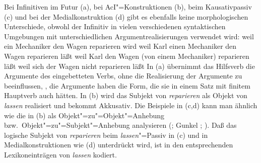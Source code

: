 Bei Infinitiven im Futur (a), bei AcI"=Konstruktionen (b), 
beim Kausativpassiv (c)
und bei der Medialkonstruktion (d) gibt es ebenfalls
keine morphologischen Unterschiede, obwohl der Infinitiv in vielen verschiedenen 
syntaktischen Umgebungen mit unterschiedlichen Argumentrealisierungen verwendet wird:
\eal
\label{bsp-kasus-reparieren}
\ex weil    ein Mechaniker     den Wagen     reparieren wird
\ex weil    Karl       einen Mechaniker     den Wagen     reparieren läßt
\ex weil    Karl       den Wagen     (von einem Mechaniker) reparieren läßt
\ex weil    sich der Wagen     nicht reparieren läßt
\zl
In (a) übernimmt das Hilfsverb die Argumente des eingebetteten Verbs, ohne die Realisierung
der Argumente zu beeinflussen, \dash, die Argumente haben die Form, die sie in einem Satz mit finitem
Hauptverb auch hätten. In (b) wird das Subjekt
von \emph{reparieren} als Objekt von \emph{lassen} realisiert und bekommt Akkusativ.
Die Beispiele in (c,d) kann man ähnlich wie die in (b)
als Objekt"=zu"=Objekt"=Anhebung
bzw.\ Objekt"=zu"=Subjekt"=Anhebung analysieren (\citealp[]{Bierwisch90a}; Gunkel \citeyear[]{Gunkel99a}; \citeyear[Kapitel~4.4.2]{Gunkel2003b}).
Daß das logische Subjekt von \emph{reparieren} beim \emph{lassen}"=Passiv in (c)
und in Medialkonstruktionen wie (d) unterdrückt wird, ist in den entsprechenden Lexikoneinträgen
von \emph{lassen} kodiert. 

